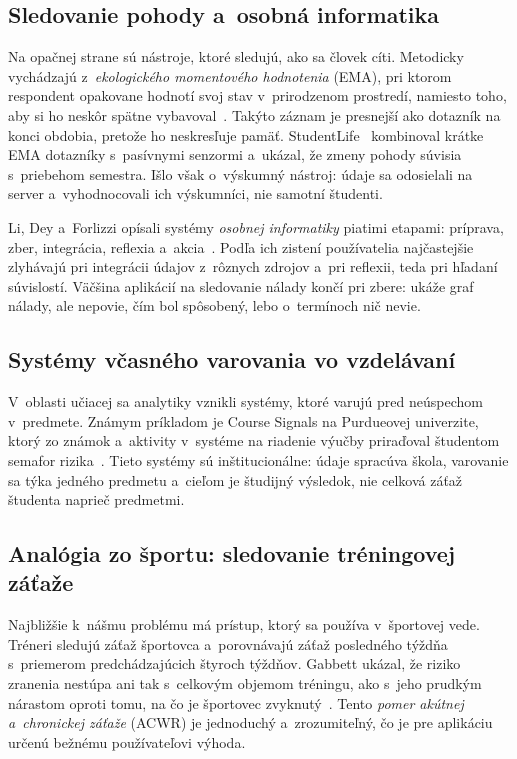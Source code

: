 \documentclass[10pt,twoside,slovak,a4paper]{article}
\begin{document}
\subsection{Sledovanie pohody a~osobná informatika}

Na opačnej strane sú nástroje, ktoré sledujú, ako sa človek cíti.
Metodicky vychádzajú z~\emph{ekologického momentového hodnotenia} (EMA), pri
ktorom respondent opakovane hodnotí svoj stav v~prirodzenom prostredí,
namiesto toho, aby si ho neskôr spätne vybavoval~\cite{Shiffman:EMA}. Takýto
záznam je presnejší ako dotazník na konci obdobia, pretože ho neskresľuje
pamäť. StudentLife~\cite{Wang:StudentLife} kombinoval krátke EMA dotazníky
s~pasívnymi senzormi a~ukázal, že zmeny pohody súvisia s~priebehom semestra.
Išlo však o~výskumný nástroj: údaje sa odosielali na server a~vyhodnocovali
ich výskumníci, nie samotní študenti.

Li, Dey a~Forlizzi opísali systémy \emph{osobnej informatiky} piatimi
etapami: príprava, zber, integrácia, reflexia a~akcia~\cite{Li:PersonalInformatics}.
Podľa ich zistení používatelia najčastejšie zlyhávajú pri integrácii údajov
z~rôznych zdrojov a~pri reflexii, teda pri hľadaní súvislostí. Väčšina
aplikácií na sledovanie nálady končí pri zbere: ukáže graf nálady, ale
nepovie, čím bol spôsobený, lebo o~termínoch nič nevie.

\subsection{Systémy včasného varovania vo vzdelávaní}

V~oblasti učiacej sa analytiky vznikli systémy, ktoré varujú pred
neúspechom v~predmete. Známym príkladom je Course Signals na Purdueovej
univerzite, ktorý zo známok a~aktivity v~systéme na riadenie výučby
priraďoval študentom semafor rizika~\cite{Arnold:CourseSignals}. Tieto
systémy sú inštitucionálne: údaje spracúva škola, varovanie sa týka jedného
predmetu a~cieľom je študijný výsledok, nie celková záťaž študenta naprieč
predmetmi.

\subsection{Analógia zo športu: sledovanie tréningovej záťaže}

Najbližšie k~nášmu problému má prístup, ktorý sa používa v~športovej vede.
Tréneri sledujú záťaž športovca a~porovnávajú záťaž posledného týždňa
s~priemerom predchádzajúcich štyroch týždňov. Gabbett ukázal, že riziko
zranenia nestúpa ani tak s~celkovým objemom tréningu, ako s~jeho prudkým
nárastom oproti tomu, na čo je športovec zvyknutý~\cite{Gabbett:ACWR}. Tento
\emph{pomer akútnej a~chronickej záťaže} (ACWR) je jednoduchý a~zrozumiteľný,
čo je pre aplikáciu určenú bežnému používateľovi výhoda.
\end{document}
